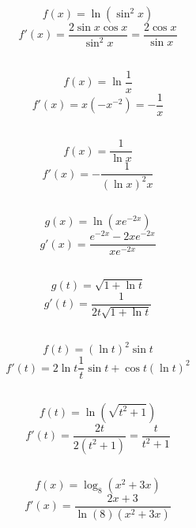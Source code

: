\documentclass[11pt,oneside,titlepage]{book}
\begin{document}
$$f(x) = \ln (\sin^2 x)$$
$$f'(x) = \frac{2 \sin x \cos x}{ \sin^2 x } = \frac{2 \cos x}{ \sin x }$$

\subsection{}

$$f(x) = \ln \frac 1 x$$
$$f'(x) = x (- x^{-2}) = - \frac{1}{x}$$

\subsection{}

$$f(x) = \frac{1}{\ln x}$$
$$f'(x) = - \frac{1}{(\ln x)^2 x} $$

\subsection{}

$$g(x) = \ln (x e^{-2x})$$
$$g'(x) = \frac{e^{-2x} -2xe^{-2x}}{x e^{-2x}}$$

\subsection{}

$$g(t) = \sqrt{1 + \ln t}$$
$$g'(t) = \frac{1}{2t \sqrt{1 + \ln t} }$$

\subsection{}

$$f(t) = (\ln t)^2 \sin t$$
$$f'(t) = 2 \ln t \frac 1 t \sin t + \cos t (\ln t)^2$$

\subsection{}

$$f(t) = \ln (\sqrt{t^2 + 1})$$
$$f'(t) = \frac{2t}{2( t^2 + 1)} = \frac{t}{t^2 + 1}$$

\subsection{}

$$f(x) = \log_8{(x^2 + 3x)}$$
$$f'(x) = \frac{2x + 3}{\ln (8) (x^2 + 3x)}$$

\subsection{}
\end{document}
